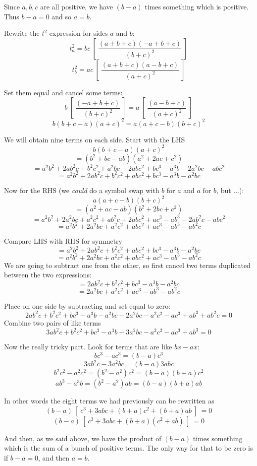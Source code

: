 \documentclass[11pt, oneside]{article}
\begin{document}
Since $a,b,c$ are all positive, we have $(b-a)$ times something which is positive.  Thus $b - a = 0$ and so $a = b$.

Rewrite the $t^2$ expression for sides $a$ and $b$:
\[ t_a^2 = bc \ [ \ \frac{(a + b + c)(-a + b + c)}{(b+c)^2} \ ]  \]
\[ t_b^2 = ac \ [ \ \frac{(a + b + c)(a - b + c)}{(a+c)^2} \ ]  \]

Set them equal and cancel some terms:
\[ b \ [ \ \frac{(-a + b + c)}{(b+c)^2} \ ] = a \ [ \ \frac{(a - b + c)}{(a+c)^2} \ ]  \]
\[ b(b + c - a)(a + c)^2 = a(a + c - b)(b+c)^2 \]

We will obtain nine terms on each side.  Start with the LHS
\[ b(b + c - a)(a + c)^2 \]
\[ = (b^2 + bc - ab)(a^2 + 2ac + c^2) \]
\[ = a^2b^2 + 2ab^2c + b^2c^2 + a^2bc + 2abc^2 + bc^3 - a^3b - 2a^2bc - abc^2 \]
\[ = a^2b^2 + 2ab^2c + b^2c^2 + abc^2 + bc^3 - a^3b - a^2bc \]

Now for the RHS (we \emph{could} do a symbol swap with $b$ for $a$ and $a$ for $b$, but ...):
\[ a(a + c - b)(b+c)^2 \]
\[ = ( a^2 + ac - ab)(b^2 + 2bc + c^2) \]
\[ = a^2b^2 + 2a^2bc + a^2c^2 + ab^2c + 2abc^2 + ac^3 - ab^3 - 2ab^2c - abc^2 \]
\[ = a^2b^2 + 2a^2bc + a^2c^2 + abc^2 + ac^3 - ab^3 - ab^2c \]

Compare LHS with RHS for symmetry
\[ = a^2b^2 + 2ab^2c + b^2c^2 + abc^2 + bc^3 - a^3b - a^2bc \]
\[ = a^2b^2 + 2a^2bc + a^2c^2 + abc^2 + ac^3 - ab^3 - ab^2c \]
We are going to subtract one from the other, so first cancel two terms duplicated between the two expressions:
\[ = 2ab^2c + b^2c^2 + bc^3 - a^3b - a^2bc \]
\[ = 2a^2bc + a^2c^2 + ac^3 - ab^3 - ab^2c \]

Place on one side by subtracting and set equal to zero:
\[ 2ab^2c + b^2c^2 + bc^3 - a^3b - a^2bc - 2a^2bc - a^2c^2 - ac^3 + ab^3 + ab^2c = 0 \]
Combine two pairs of like terms
\[ 3ab^2c + b^2c^2 + bc^3 - a^3b - 3a^2bc - a^2c^2 - ac^3 + ab^3 = 0 \]

Now the really tricky part.  Look for terms that are like $bx-ax$:
\[ bc^3 - ac^3 = (b-a)c^3 \]
\[ 3ab^2c - 3a^2bc = (b-a)3abc \]
\[ b^2c^2 - a^2c^2 = (b^2 - a^2)c^2 = (b-a)(b+a)c^2  \]
\[  ab^3 - a^3b = (b^2 - a^2)ab = (b-a)(b+a)ab \]

In other words the eight terms we had previously can be rewritten as
\[ (b-a) \ [ \ c^3 + 3abc + (b+a)c^2 + (b+a)ab \ ] \ = 0 \]
\[ (b-a) \ [ \ c^3 + 3abc + (b+a)(c^2 + ab) \ ] \ = 0 \]

And then, as we said above, we have the product of $(b-a)$ times something which is the sum of a bunch of positive terms.  The only way for that to be zero is if $b - a = 0$, and then $a = b$.
\end{document}
